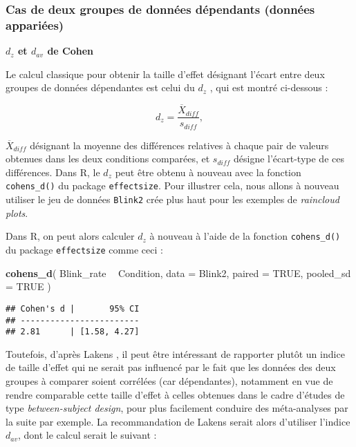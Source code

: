 \documentclass[
  french,
]{book}
\newenvironment{Shaded}{\begin{snugshade}}{\end{snugshade}}
\newcommand{\DataTypeTok}[1]{\textcolor[rgb]{0.13,0.29,0.53}{#1}}
\newcommand{\KeywordTok}[1]{\textcolor[rgb]{0.13,0.29,0.53}{\textbf{#1}}}
\newcommand{\NormalTok}[1]{#1}
\newcommand{\OperatorTok}[1]{\textcolor[rgb]{0.81,0.36,0.00}{\textbf{#1}}}
\newcommand{\OtherTok}[1]{\textcolor[rgb]{0.56,0.35,0.01}{#1}}
\newcommand{\StringTok}[1]{\textcolor[rgb]{0.31,0.60,0.02}{#1}}
\begin{document}
\hypertarget{cas-de-deux-groupes-de-donnuxe9es-duxe9pendants-donnuxe9es-appariuxe9es}{%
\subsubsection{Cas de deux groupes de données dépendants (données appariées)}\label{cas-de-deux-groupes-de-donnuxe9es-duxe9pendants-donnuxe9es-appariuxe9es}}

\textbf{\(d_{z}\) et \(d_{av}\) de Cohen}

Le calcul classique pour obtenir la taille d'effet désignant l'écart entre deux groupes de données dépendantes est celui du \(d_{z}\) \autocite{lakensCalculatingReportingEffect2013}, qui est montré ci-dessous :

\[d_{z} = \frac{\overline{X} _{diff}}{s_{diff}},\]

\(\overline{X} _{diff}\) désignant la moyenne des différences relatives à chaque pair de valeurs obtenues dans les deux conditions comparées, et \(s_{diff}\) désigne l'écart-type de ces différences. Dans R, le \(d_{z}\) peut être obtenu à nouveau avec la fonction \texttt{cohens\_d()} du package \texttt{effectsize}. Pour illustrer cela, nous allons à nouveau utiliser le jeu de données \texttt{Blink2} crée plus haut pour les exemples de \emph{raincloud plots}.

Dans R, on peut alors calculer \(d_{z}\) à nouveau à l'aide de la fonction \texttt{cohens\_d()} du package \texttt{effectsize} comme ceci :

\begin{Shaded}
\begin{Highlighting}[]
\KeywordTok{cohens_d}\NormalTok{(}
\NormalTok{  Blink_rate }\OperatorTok{~}\StringTok{ }\NormalTok{Condition, }
  \DataTypeTok{data =}\NormalTok{ Blink2, }
  \DataTypeTok{paired =} \OtherTok{TRUE}\NormalTok{, }
  \DataTypeTok{pooled_sd =} \OtherTok{TRUE}
\NormalTok{  )}
\end{Highlighting}
\end{Shaded}

\begin{verbatim}
## Cohen's d |       95% CI
## ------------------------
## 2.81      | [1.58, 4.27]
\end{verbatim}

Toutefois, d'après Lakens \autocite*{lakensCalculatingReportingEffect2013}, il peut être intéressant de rapporter plutôt un indice de taille d'effet qui ne serait pas influencé par le fait que les données des deux groupes à comparer soient corrélées (car dépendantes), notamment en vue de rendre comparable cette taille d'effet à celles obtenues dans le cadre d'études de type \emph{between-subject design}, pour plus facilement conduire des méta-analyses par la suite par exemple. La recommandation de Lakens \autocite*{lakensCalculatingReportingEffect2013} serait alors d'utiliser l'indice \(d_{av}\), dont le calcul serait le suivant :
\end{document}
